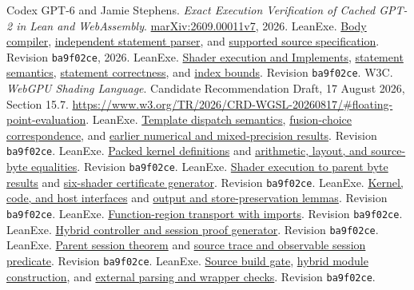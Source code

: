 \documentclass[11pt]{article}
\newcommand{\code}[1]{\texttt{#1}}
\newcommand{\src}[2]{\href{https://github.com/jsmorph/leanexe/blob/ba9f02ce930243a3d35d4d10df6f9c97850ca1e8/#1}{#2}}
\begin{document}
\begin{thebibliography}{16}
 Codex GPT-6 and Jamie Stephens.  \emph{Exact Execution Verification of Cached GPT-2 in Lean and WebAssembly}.  \href{http://127.0.0.1:8405/abs/2609.00011v7}{marXiv:2609.00011v7}, 2026.
 LeanExe.  \src{LeanExe/WGSL/Compile.lean}{Body compiler}, \src{LeanExe/WGSL/BodyParse.lean}{independent statement parser}, and \src{docs/wgsl/lean-source-specification.md}{supported source specification}.  Revision \code{ba9f02ce}, 2026.
 LeanExe.  \src{LeanExe/WGSL/BodyExecution.lean}{Shader execution and Implements}, \src{LeanExe/WGSL/StatementRun.lean}{statement semantics}, \src{LeanExe/WGSL/StatementProof.lean}{statement correctness}, and \src{LeanExe/WGSL/SourceBounds.lean}{index bounds}.  Revision \code{ba9f02ce}.
 W3C.  \emph{WebGPU Shading Language}.  Candidate Recommendation Draft, 17 August 2026, Section 15.7.  \url{https://www.w3.org/TR/2026/CRD-WGSL-20260817/#floating-point-evaluation}.
 LeanExe.  \src{LeanExe/WGSL/Dispatch.lean}{Template dispatch semantics}, \src{proofs/talos/lean/Project/Gpt2/MatrixArithmetic.lean}{fusion-choice correspondence}, and \src{docs/wgsl/README.md}{earlier numerical and mixed-precision results}.  Revision \code{ba9f02ce}.
 LeanExe.  \src{LeanExe/WGSL/Gpt2Packed.lean}{Packed kernel definitions} and \src{proofs/talos/lean/Project/Gpt2/PackedBody.lean}{arithmetic, layout, and source-byte equalities}.  Revision \code{ba9f02ce}.
 LeanExe.  \src{proofs/talos/lean/Project/Gpt2/PackedShader.lean}{Shader execution to parent byte results} and \src{tools/wgsl/gpt2/packed-shaders.js}{six-shader certificate generator}.  Revision \code{ba9f02ce}.
 LeanExe.  \src{proofs/talos/lean/Project/Gpt2/PackedBackend.lean}{Kernel, code, and host interfaces} and \src{proofs/talos/lean/Project/Gpt2/PackedCall.lean}{output and store-preservation lemmas}.  Revision \code{ba9f02ce}.
 LeanExe.  \src{proofs/talos/lean/Project/FunctionRegion/Imports.lean}{Function-region transport with imports}.  Revision \code{ba9f02ce}.
 LeanExe.  \src{tools/wgsl/gpt2/packed-compose.js}{Hybrid controller and session proof generator}.  Revision \code{ba9f02ce}.
 LeanExe.  \src{proofs/talos/lean/Project/Gpt2CachedStep/Session/Spec.lean}{Parent session theorem} and \src{proofs/talos/lean/Project/Gpt2CachedStep/Session/State.lean}{source trace and observable session predicate}.  Revision \code{ba9f02ce}.
 LeanExe.  \src{tools/wgsl/gpt2/packed-build.js}{Source build gate}, \src{tools/wgsl/gpt2/packed-module.js}{hybrid module construction}, and \src{tools/wgsl/gpt2/packed-check.js}{external parsing and wrapper checks}.  Revision \code{ba9f02ce}.

\end{thebibliography}
\end{document}
